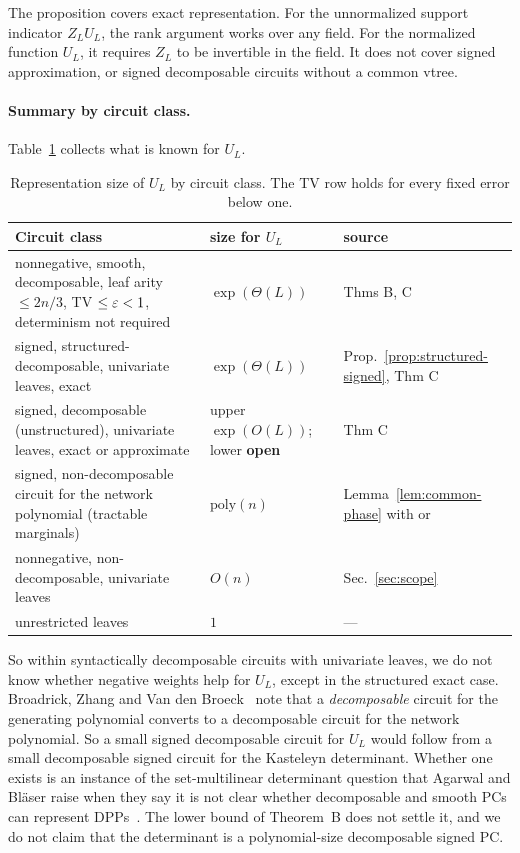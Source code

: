 The proposition covers exact representation. For the unnormalized support indicator $Z_LU_L$, the rank argument works over any field. For the normalized function $U_L$, it requires $Z_L$ to be invertible in the field. It does not cover signed approximation, or signed decomposable circuits without a common vtree.

\paragraph{Summary by circuit class.} Table~\ref{tab:signed} collects what is known for $U_L$.

\begin{table}[h]
\centering\small
\begin{tabular}{@{}p{7.6cm}p{2.9cm}p{3.1cm}@{}}
\toprule
Circuit class & size for $U_L$ & source\\
\midrule
nonnegative, smooth, decomposable, leaf arity $\le2n/3$, TV $\le\varepsilon<1$, determinism not required & $\exp(\Theta(L))$ & Thms B, C\\
signed, structured-decomposable, univariate leaves, exact & $\exp(\Theta(L))$ & Prop.~\ref{prop:structured-signed}, Thm C\\
signed, decomposable (unstructured), univariate leaves, exact or approximate & upper $\exp(O(L))$; lower \textbf{open} & Thm C\\
signed, non-decomposable circuit for the network polynomial (tractable marginals) & $\mathrm{poly}(n)$ & Lemma~\ref{lem:common-phase} with \cite[Thm.~8.1]{AgarwalBlaser24} or \cite[Thm.~3]{BroadrickZhangVdB24}\\
nonnegative, non-decomposable, univariate leaves & $O(n)$ & Sec.~\ref{sec:scope}\\
unrestricted leaves & $1$ & ---\\
\bottomrule
\end{tabular}
\caption{Representation size of $U_L$ by circuit class. The TV row holds for every fixed error below one.}
\label{tab:signed}
\end{table}

So within syntactically decomposable circuits with univariate leaves, we do not know whether negative weights help for $U_L$, except in the structured exact case. Broadrick, Zhang and Van den Broeck~\cite[Lemma~3]{BroadrickZhangVdB24} note that a \emph{decomposable} circuit for the generating polynomial converts to a decomposable circuit for the network polynomial. So a small signed decomposable circuit for $U_L$ would follow from a small decomposable signed circuit for the Kasteleyn determinant. Whether one exists is an instance of the set-multilinear determinant question that Agarwal and Bl\"aser raise when they say it is not clear whether decomposable and smooth PCs can represent DPPs~\cite[Sec.~4]{AgarwalBlaser24}. The lower bound of Theorem~B does not settle it, and we do not claim that the determinant is a polynomial-size decomposable signed PC.

